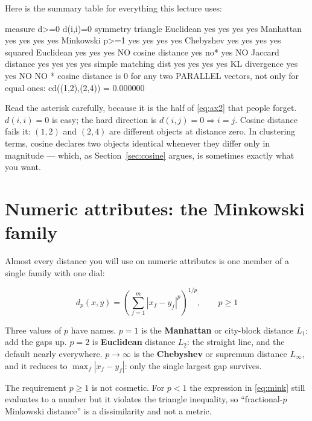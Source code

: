 \documentclass[11pt]{article}
\begin{document}
Here is the summary table for everything this lecture uses:

\begin{codeout}
measure                  d>=0  d(i,i)=0  symmetry  triangle
Euclidean                 yes       yes       yes       yes
Manhattan                 yes       yes       yes       yes
Minkowski p>=1            yes       yes       yes       yes
Chebyshev                 yes       yes       yes       yes
squared Euclidean         yes       yes       yes        NO
cosine distance           yes       no*       yes        NO
Jaccard distance          yes       yes       yes       yes
simple matching dist      yes       yes       yes       yes
KL divergence             yes       yes        NO        NO
* cosine distance is 0 for any two PARALLEL vectors, not only for
  equal ones: cd((1,2),(2,4)) = 0.000000
\end{codeout}

Read the asterisk carefully, because it is the half of \eqref{eq:ax2} that
people forget. $d(i,i) = 0$ is easy; the hard direction is
$d(i,j) = 0 \Rightarrow i = j$. Cosine distance fails it: $(1,2)$ and
$(2,4)$ are different objects at distance zero. In clustering terms, cosine
declares two objects identical whenever they differ only in magnitude ---
which, as Section~\ref{sec:cosine} argues, is sometimes exactly what you
want.

\section{Numeric attributes: the Minkowski family}
\label{sec:minkowski}

Almost every distance you will use on numeric attributes is one member of a
single family with one dial:

\begin{equation}
  d_p(x,y) = \left( \sum_{f=1}^{m} |x_f - y_f|^p \right)^{1/p},
  \qquad p \ge 1
  \label{eq:mink}
\end{equation}

Three values of $p$ have names. $p = 1$ is the \textbf{Manhattan} or
city-block distance $L_1$: add the gaps up. $p = 2$ is \textbf{Euclidean}
distance $L_2$: the straight line, and the default nearly everywhere.
$p \to \infty$ is the \textbf{Chebyshev} or supremum distance $L_\infty$, and
it reduces to $\max_f |x_f - y_f|$: only the single largest gap survives.

The requirement $p \ge 1$ is not cosmetic. For $p < 1$ the expression in
\eqref{eq:mink} still evaluates to a number but it violates the triangle
inequality, so ``fractional-$p$ Minkowski distance'' is a dissimilarity and
not a metric.
\end{document}
